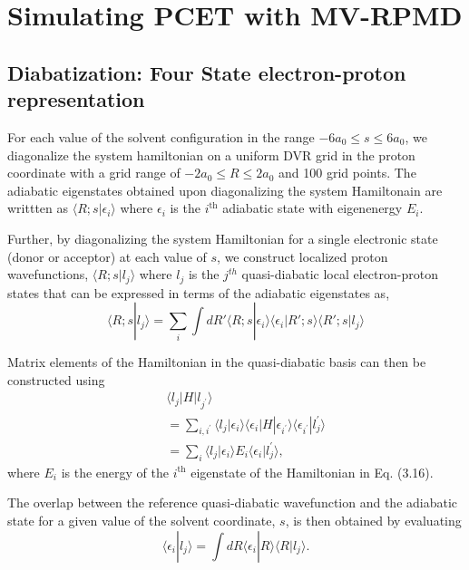 \documentclass[phd,tocprelim]{cornell}
\begin{document}
\chapter{Simulating PCET with MV-RPMD}
\section{Diabatization: Four State electron-proton representation}

For each value of the solvent configuration 
in the range $-6 a_0 \leq s \leq 6 a_0$,
we diagonalize the system hamiltonian on 
a uniform DVR grid in the proton coordinate
with a grid range of $ -2 a_0 \leq R \leq 2
a_0$ and 100 grid points. The adiabatic
eigenstates obtained upon diagonalizing the 
system Hamiltonain are writtten as 
$\langle R;s|\epsilon_i\rangle$ where
$\epsilon_i$ is the $i^\textrm{th}$ adiabatic state
with eigenenergy $E_i$.

Further, by diagonalizing the system Hamiltonian
for a single electronic state (donor or acceptor) 
at each value of $s$, we construct localized 
proton wavefunctions, $\langle R;s | l_j \rangle$
where $l_j$ is the $j^{th} $ quasi-diabatic local
electron-proton states that can be expressed 
in terms of the adiabatic eigenstates as,
\begin{equation} \label{eq:localstate} \langle
R;s | l_j \rangle = \sum_i \int d R'
\langle R;s |\epsilon_i \rangle \langle
\epsilon_i | R';s\rangle \langle R';s | l_j
\rangle \end{equation}

Matrix elements of the Hamiltonian in
the quasi-diabatic basis can then be 
constructed using
\begin{eqnarray} \label{eq:localstate2} 
\nonumber
&& \langle
    l_j | H | l_{j^\prime}\rangle \\
\nonumber
&& = \sum_{i,i^\prime} \langle l_j| \epsilon_i\rangle
    \langle \epsilon_i | H |\epsilon_{i^\prime}\rangle
    \langle \epsilon_{i^\prime}| l_j^\prime \rangle\\
    && = \sum_{i} \langle l_j| \epsilon_i\rangle E_{i}
    \langle \epsilon_i| l_j^\prime \rangle,
\end{eqnarray}
where $E_i$ is the energy of the $i^\textrm{th}$ eigenstate
of the Hamiltonian in Eq. (3.16). 

The overlap between the reference quasi-diabatic 
wavefunction and the adiabatic state for a given 
value of the solvent coordinate, $s$, is then 
obtained by evaluating 
\begin{equation} \label{eq:overlap} \langle
\epsilon_i | l_j \rangle = \int dR \langle \epsilon_i |R \rangle
\langle R | l_j \rangle. \end{equation}
\end{document}
